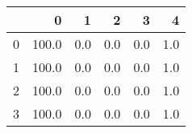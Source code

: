\begin{tabular}{lrrrrr}
\toprule
{} &      0 &    1 &    2 &    3 &    4 \\
\midrule
0 &  100.0 &  0.0 &  0.0 &  0.0 &  1.0 \\
1 &  100.0 &  0.0 &  0.0 &  0.0 &  1.0 \\
2 &  100.0 &  0.0 &  0.0 &  0.0 &  1.0 \\
3 &  100.0 &  0.0 &  0.0 &  0.0 &  1.0 \\
\bottomrule
\end{tabular}
